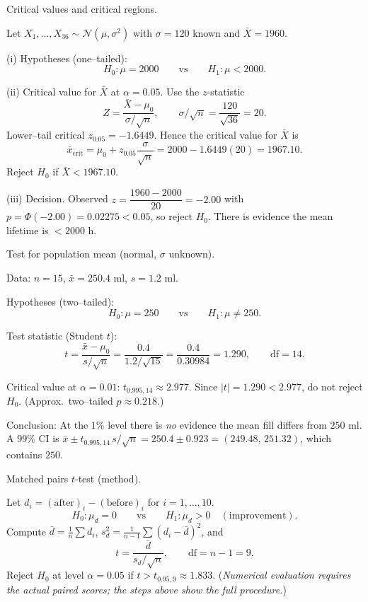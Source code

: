 \documentclass[11pt]{article}
\def\textbf#1{#1}%
\begin{document}
\begin{solution}
\textbf{Critical values and critical regions.}

Let $X_1,\dots,X_{36}\sim\mathcal N(\mu,\sigma^2)$ with $\sigma=120$ known and $\bar X=1960$.

\textbf{(i) Hypotheses (one–tailed):}
\[
H_0:\mu=2000 \qquad\text{vs}\qquad H_1:\mu<2000.
\]

\textbf{(ii) Critical value for $\bar X$ at $\alpha=0.05$.}
Use the $z$-statistic
\[
Z=\frac{\bar X-\mu_0}{\sigma/\sqrt{n}},\qquad \sigma/\sqrt{n}=\frac{120}{\sqrt{36}}=20.
\]
Lower–tail critical $z_{0.05}=-1.6449$. Hence the critical value for $\bar X$ is
\[
\bar x_{\text{crit}}=\mu_0+z_{0.05}\frac{\sigma}{\sqrt n}
=2000-1.6449(20)=\boxed{1967.10}.
\]
Reject $H_0$ if $\bar X<1967.10$.

\textbf{(iii) Decision.}
Observed $z=\dfrac{1960-2000}{20}=-2.00$ with $p=\Phi(-2.00)=0.02275<0.05$,
so $\boxed{\text{reject }H_0}$. There is evidence the mean lifetime is $<2000$ h.
\end{solution}


\begin{solution}
\textbf{Test for population mean (normal, $\sigma$ unknown).}

Data: $n=15$, $\bar x=250.4$ ml, $s=1.2$ ml.

\textbf{Hypotheses (two–tailed):}
\[
H_0:\mu=250 \qquad\text{vs}\qquad H_1:\mu\neq 250.
\]

\textbf{Test statistic (Student $t$):}
\[
t=\frac{\bar x-\mu_0}{s/\sqrt n}
=\frac{0.4}{1.2/\sqrt{15}}
=\frac{0.4}{0.30984}=1.290,\qquad \text{df}=14.
\]

\textbf{Critical value at }$\alpha=0.01$: $t_{0.995,14}\approx 2.977$. Since $|t|=1.290<2.977$, do not reject $H_0$.
(Approx.\ two–tailed $p\approx 0.218$.)

\textbf{Conclusion:} At the $1\%$ level there is \emph{no} evidence the mean fill differs from $250$ ml.
A $99\%$ CI is $\bar x\pm t_{0.995,14}\,s/\sqrt n=250.4\pm 0.923=(249.48,\,251.32)$, which contains $250$.
\end{solution}


\begin{solution}
\textbf{Matched pairs $t$-test (method).}

Let $d_i=(\text{after})_i-(\text{before})_i$ for $i=1,\dots,10$.
\[
H_0:\mu_d=0 \qquad\text{vs}\qquad H_1:\mu_d>0 \quad(\text{improvement}).
\]
Compute $\bar d=\frac1{n}\sum d_i$, $s_d^2=\frac1{n-1}\sum (d_i-\bar d)^2$, and
\[
t=\frac{\bar d}{s_d/\sqrt n},\qquad \text{df}=n-1=9.
\]
Reject $H_0$ at level $\alpha=0.05$ if $t>t_{0.95,9}\approx 1.833$. 
(\emph{Numerical evaluation requires the actual paired scores; the steps above show the full procedure.})
\end{solution}
\end{document}
